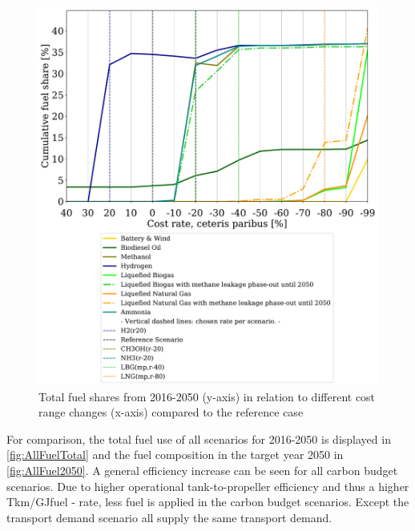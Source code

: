 \documentclass[article]{elsarticle}
\begin{document}
\begin{figure}[htb]
    \centering
    \includegraphics[width=\textwidth]{figures/costVariation.pdf}
    \caption{Total fuel shares from 2016-2050 (y-axis) in relation to different cost range changes (x-axis) compared to the reference case}
    \label{fig:costVariation}
\end{figure}

For comparison, the total fuel use of all scenarios for 2016-2050 is displayed in \autoref{fig:AllFuelTotal} and the fuel composition in the target year 2050 in \autoref{fig:AllFuel2050}. A general efficiency increase can be seen for all carbon budget scenarios. Due to higher operational tank-to-propeller efficiency and thus a higher Tkm/GJfuel - rate, less fuel is applied in the carbon budget scenarios. Except the transport demand scenario all supply the same transport demand.
\end{document}
